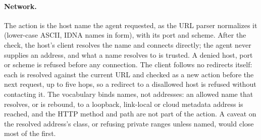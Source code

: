 \paragraph{Network.} The action is the host name the agent requested, as the
URL parser normalizes it (lower-case ASCII, IDNA names in  form), with
its port and scheme. After the check, the host's client resolves the name and
connects directly; the agent never supplies an address, and what a name
resolves to is trusted. A denied host, port or scheme is
refused before any connection. The client follows
no redirects itself: each  is resolved against the current URL
and checked as a new action before the next request, up to five hops, so a
redirect to a disallowed host is refused without contacting
it. The vocabulary binds names, not addresses: an
allowed name that resolves, or is rebound, to a loopback, link-local or cloud
metadata address is reached, and the HTTP method and path are not part of the
action. A caveat on the resolved address's class, or refusing private ranges
unless named, would close most of the first.

